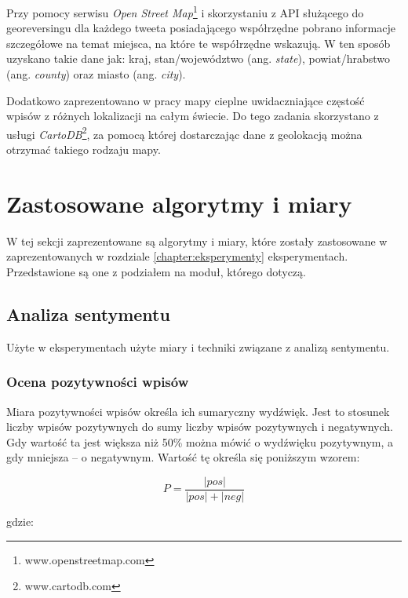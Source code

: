 Przy pomocy serwisu \textit{Open Street Map}\footnote{www.openstreetmap.com} i
skorzystaniu z API służącego do georeversingu dla każdego tweeta posiadającego
współrzędne pobrano informacje szczegółowe na temat miejsca, na które te
współrzędne wskazują. W ten sposób uzyskano takie dane jak: kraj,
stan/województwo (ang. \textit{state}), powiat/hrabstwo (ang. \textit{county})
oraz miasto (ang. \textit{city}).

Dodatkowo zaprezentowano w pracy mapy cieplne uwidaczniające częstość wpisów z
różnych lokalizacji na całym świecie. Do tego zadania skorzystano z usługi
\textit{CartoDB}\footnote{www.cartodb.com}, za pomocą której dostarczając dane
z geolokacją można otrzymać takiego rodzaju mapy.




\section{Zastosowane algorytmy i miary}
\label{section:wielkosciwykorzystywane}
W tej sekcji zaprezentowane są algorytmy i miary, które zostały zastosowane w
zaprezentowanych w rozdziale \ref{chapter:eksperymenty} eksperymentach.
Przedstawione są one z podziałem na moduł, którego dotyczą.

\subsection{Analiza sentymentu}
Użyte w eksperymentach użyte miary i techniki związane z analizą sentymentu.

\subsubsection{Ocena pozytywności wpisów}
\label{subsection:ocenapozytywnosci}
Miara pozytywności wpisów określa ich sumaryczny wydźwięk. Jest to stosunek
liczby wpisów pozytywnych do sumy liczby wpisów pozytywnych i negatywnych. Gdy
wartość ta jest większa niż 50\% można mówić o wydźwięku pozytywnym, a gdy
mniejsza -- o negatywnym. Wartość tę określa się poniższym wzorem: 

\begin{equation}
\label{equation:pozytywnosc}
P = \frac{|pos|}{|pos| + |neg|}
\end{equation}

gdzie:

